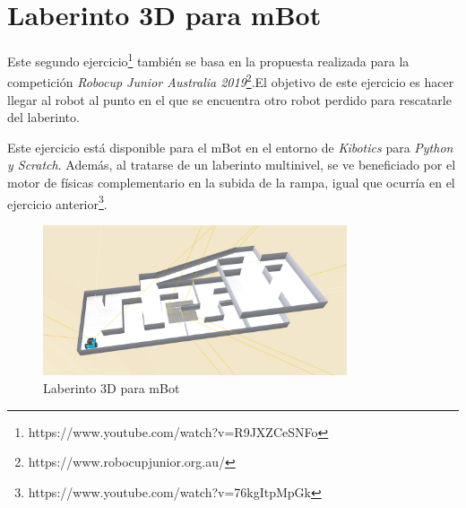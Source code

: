 \newpage
\section{Laberinto 3D para mBot}
Este segundo ejercicio\footnote{https://www.youtube.com/watch?v=R9JXZCeSNFo} también se basa en la propuesta realizada para la competición \textit{Robocup Junior Australia 2019}\footnote{https://www.robocupjunior.org.au/}.El objetivo de este ejercicio es hacer llegar al robot al punto en el que se encuentra otro robot perdido para rescatarle del laberinto. \newline

Este ejercicio está disponible para el mBot en el entorno de \textit{Kibotics} para \textit{Python y Scratch}. Además, al tratarse de un laberinto multinivel, se ve beneficiado por el motor de físicas complementario en la subida de la rampa, igual que ocurría en el ejercicio anterior\footnote{https://www.youtube.com/watch?v=76kgItpMpGk}.

\begin{figure}[h!]
    \centering
    \includegraphics[width=0.8\textwidth, height=0.8\textwidth]{laberinto.png}
    \caption{Laberinto 3D para mBot}
    \label{fig:Laberinto 3D para mBot}
\end{figure}

